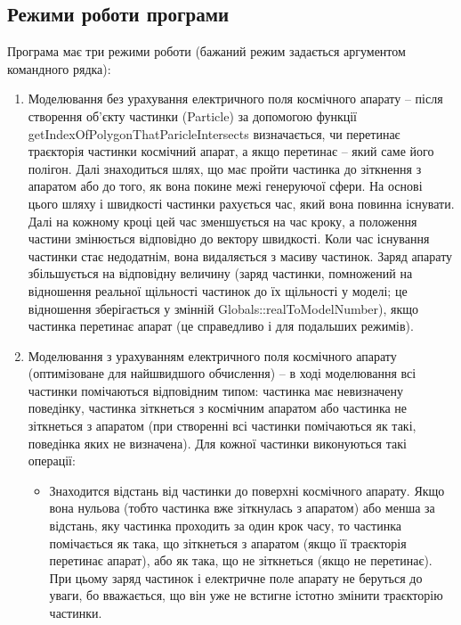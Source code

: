 \documentclass[a4paper,12pt]{article}
\begin{document}
\subsection{Режими роботи програми} \label{sec:modes}
Програма має три режими роботи (бажаний режим задається аргументом командного рядка):
\begin{enumerate}
\item Моделювання без урахування електричного поля космічного апарату -- після створення об’єкту частинки (Particle) за допомогою функції getIndexOfPolygonThatParicleIntersects визначається, чи перетинає траєкторія частинки космічний апарат, а якщо перетинає -- який саме його полігон. Далі знаходиться шлях, що має пройти частинка до зіткнення з апаратом або до того, як вона покине межі генеруючої сфери. На основі цього шляху і швидкості частинки рахується час, який вона повинна існувати. Далі на кожному кроці цей час зменшується на час кроку, а положення частини змінюється відповідно до вектору швидкості. Коли час існування частинки стає недодатнім, вона видаляється з масиву частинок. Заряд апарату збільшується на відповідну величину (заряд частинки, помножений на відношення реальної щільності частинок до їх щільності у моделі; це відношення зберігається у змінній Globals::realToModelNumber), якщо частинка перетинає апарат (це справедливо і для подальших режимів).

\item Моделювання з урахуванням електричного поля космічного апарату (оптимізоване для найшвидшого обчислення) -- в ході моделювання всі частинки помічаються відповідним типом: частинка має невизначену поведінку, частинка зіткнеться з космічним апаратом або частинка не зіткнеться з апаратом (при створенні всі частинки помічаються як такі, поведінка яких не визначена). Для кожної частинки виконуються такі операції:

\begin{itemize}
\item Знаходится відстань від частинки до поверхні космічного апарату. Якщо вона нульова (тобто частинка вже зіткнулась з апаратом) або менша за відстань, яку частинка проходить за один крок часу, то частинка помічається як така, що зіткнеться з апаратом (якщо її траєкторія перетинає апарат), або як така, що не зіткнеться (якщо не перетинає). При цьому заряд частинок і електричне поле апарату не беруться до уваги, бо вважається, що він уже не встигне істотно змінити траєкторію частинки.


\end{itemize}
\end{enumerate}
\end{document}
